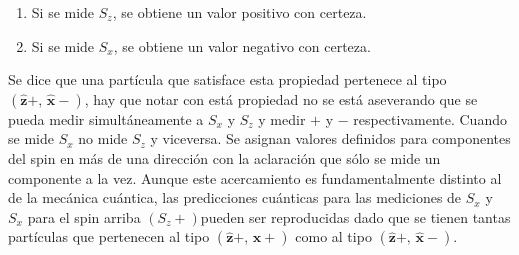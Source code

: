 \documentclass[a4paper]{article}
\begin{document}
\begin{enumerate}
\item Si se mide $S_z$, se obtiene un valor positivo con certeza.
\item Si se mide $S_x$, se obtiene un valor negativo con certeza.
\end{enumerate}
Se dice que una partícula que satisface esta propiedad pertenece al tipo $(\mathbf{\hat{z}}+,\, \mathbf{\hat{x}}-)$, hay que notar con está propiedad no se está aseverando que se pueda medir simultáneamente a $S_x$ y $S_z$ y medir $+$ y $-$ respectivamente. Cuando se mide $S_x$ no mide $S_z$ y viceversa. Se asignan valores definidos para componentes del spin en más de una dirección con la aclaración que sólo se mide un componente a la vez. Aunque este acercamiento es fundamentalmente distinto al de la mecánica cuántica, las predicciones cuánticas para las mediciones de $S_x$ y $S_x$ para el spin arriba $(S_z+)$pueden ser reproducidas dado que se tienen tantas partículas que pertenecen al tipo $(\mathbf{\hat{z}}+,\, \mathbf{\hat{x}}+)$ como al tipo $(\mathbf{\hat{z}}+,\, \mathbf{\hat{x}}-)$.
\end{document}
